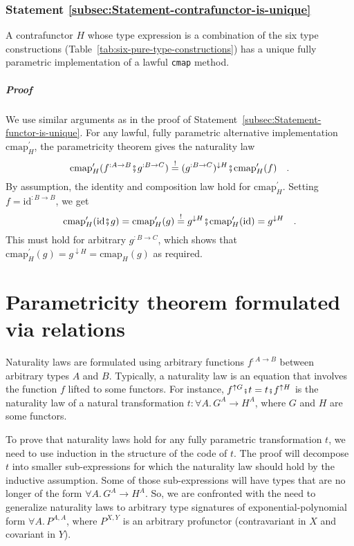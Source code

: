 \subsubsection{Statement \label{subsec:Statement-contrafunctor-is-unique}\ref{subsec:Statement-contrafunctor-is-unique}}

A contrafunctor $H$ whose type expression is a combination of the
six type constructions (Table~\ref{tab:six-pure-type-constructions})
has a unique fully parametric implementation of a lawful \lstinline!cmap!
method. 

\subparagraph{Proof}

We use similar arguments as in the proof of Statement~\ref{subsec:Statement-functor-is-unique}.
For any lawful, fully parametric alternative implementation $\text{cmap}_{H}^{\prime}$,
the parametricity theorem gives the naturality law
\[
\text{cmap}_{H}^{\prime}(f^{:A\rightarrow B}\bef g^{:B\rightarrow C})\overset{!}{=}(g^{:B\rightarrow C})^{\downarrow H}\bef\text{cmap}_{H}^{\prime}(f)\quad.
\]
By assumption, the identity and composition law hold for $\text{cmap}_{H}^{\prime}$.
Setting $f=\text{id}^{:B\rightarrow B}$, we get
\[
\text{cmap}_{H}^{\prime}(\text{id}\bef g)=\text{cmap}_{H}^{\prime}(g)\overset{!}{=}g^{\downarrow H}\bef\text{cmap}_{H}^{\prime}(\text{id})=g^{\downarrow H}\quad.
\]
This must hold for arbitrary $g^{:B\rightarrow C}$, which shows that
$\text{cmap}_{H}^{\prime}(g)=g^{\downarrow H}=\text{cmap}_{H}(g)$
as required.

\section{Parametricity theorem formulated via relations\label{sec:Parametricity-theorem-for-relations}\label{subsec:Relations-between-types}}

Naturality laws are formulated using arbitrary functions $f^{:A\rightarrow B}$
between arbitrary types $A$ and $B$. Typically, a naturality law
is an equation that involves the function $f$ lifted to some functors.
For instance, $f^{\uparrow G}\bef t=t\bef f^{\uparrow H}$ is the
naturality law of a natural transformation $t:\forall A.\,G^{A}\rightarrow H^{A}$,
where $G$ and $H$ are some functors.

To prove that naturality laws hold for any fully parametric transformation
$t$, we need to use induction in the structure of the code of $t$.
The proof will decompose $t$ into smaller sub-expressions for which
the naturality law should hold by the inductive assumption. Some of
those sub-expressions will have types that are no longer of the form
$\forall A.\,G^{A}\rightarrow H^{A}$. So, we are confronted with
the need to generalize naturality laws to arbitrary type signatures
of exponential-polynomial form $\forall A.\,P^{A,A}$, where $P^{X,Y}$
is an arbitrary profunctor (contravariant in $X$ and covariant in
$Y$). 

